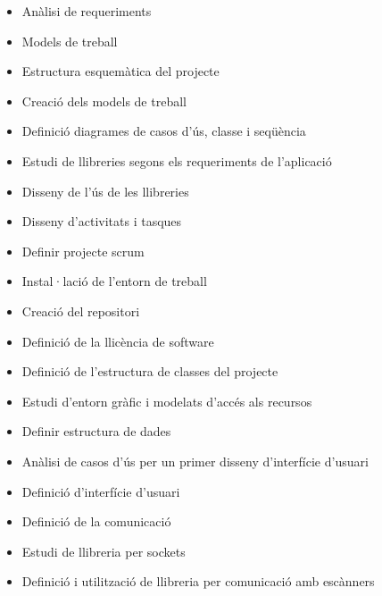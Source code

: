 \documentclass[letterpaper,11pt,catalan]{sphinxmanual}
\begin{document}
\begin{itemize}
\item {} 
Anàlisi de requeriments

\item {} 
Models de treball

\item {} 
Estructura esquemàtica del projecte

\item {} 
Creació dels models de treball

\item {} 
Definició diagrames de casos d'ús, classe i seqüència

\item {} 
Estudi de llibreries segons els requeriments de l'aplicació

\item {} 
Disseny de l'ús de les llibreries

\item {} 
Disseny d'activitats i tasques

\item {} 
Definir projecte scrum

\item {} 
Instal·lació de l'entorn de treball

\item {} 
Creació del repositori

\item {} 
Definició de la llicència de software

\item {} 
Definició de l'estructura de classes del projecte

\item {} 
Estudi d'entorn gràfic i modelats d'accés als recursos

\item {} 
Definir estructura de dades

\item {} 
Anàlisi de casos d'ús per un primer disseny d'interfície d'usuari

\item {} 
Definició d'interfície d'usuari

\item {} 
Definició de la comunicació

\item {} 
Estudi de llibreria per sockets

\item {} 
Definició i utilització de llibreria per comunicació amb escànners


\end{itemize}
\end{document}
